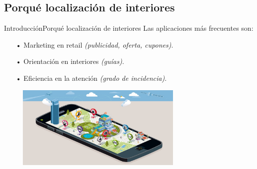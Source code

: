 \documentclass[10pt]{beamer}
\begin{document}
\subsection{Porqué localización de interiores}
\begin{frame}{Introducción}{Porqué localización de interiores}
Las aplicaciones más frecuentes son:
\begin{itemize}
	\item[•] Marketing en retail \textit{(publicidad, oferta, cupones)}.
	\item[•] Orientación en interiores \textit{(guías)}.
	\item[•] Eficiencia en la atención \textit{(grado de incidencia)}.
\end{itemize}
\includegraphics[width=10cm,height=4cm]{AAUgraphics/indoor}
\end{frame}
\end{document}

